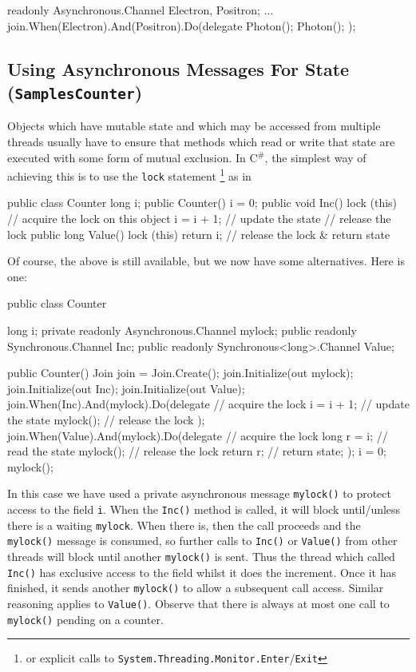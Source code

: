 \documentclass{article}
\newcommand{\csharp}{\texorpdfstring{\mbox{C$^\#$}}{C\#}}
\newcommand{\sample}[1]{\texorpdfstring{{(\texttt{Samples{\symbol{92}}#1})}}{}}
\begin{document}
\begin{lstcsharp}
  readonly Asynchronous.Channel Electron, Positron;
  ...
  join.When(Electron).And(Positron).Do(delegate { 
    Photon(); Photon();
  });
\end{lstcsharp}

\subsection{Using Asynchronous Messages For State \sample{Counter}}
Objects which have mutable state and which may be accessed from
multiple threads usually have to ensure that methods which read or
write that state are executed with some form of mutual exclusion. In \csharp, the simplest way of achieving this is to use the \verb|lock| statement
\footnote{or explicit calls to \texttt{System.Threading.Monitor.Enter}/\texttt{Exit}} as in
\begin{lstcsharp}
  public class Counter {
    long i;
    public Counter() {
      i = 0;
    }
    public void Inc() {
      lock (this) {        // acquire the lock on this object
        i = i + 1;         // update the state
      }                    // release the lock
    }
    public long Value() {
      lock (this) {
        return i;          // release the lock & return state
      }
    }
  }
\end{lstcsharp}

Of course, the above is still available, but we  now have some  alternatives. Here is one:

\begin{lstcsharp}
public class Counter {
  long i;
  private readonly Asynchronous.Channel mylock;
  public readonly Synchronous.Channel Inc;
  public readonly Synchronous<long>.Channel Value;

  public Counter() {
    Join join = Join.Create();
    join.Initialize(out mylock);
    join.Initialize(out Inc);
    join.Initialize(out Value);
    join.When(Inc).And(mylock).Do(delegate 
    { // acquire the lock
        i = i + 1;  // update the state
        mylock();  // release the lock
    });
    join.When(Value).And(mylock).Do(delegate
    { // acquire the lock
        long r = i;  // read the state
        mylock();    // release the lock
        return r;    // return state;
    });
    i = 0;
    mylock();
  }
}
\end{lstcsharp}


In this case we have used a private asynchronous message
\verb|mylock()| to protect access to the field \verb|i|. When the
\verb|Inc()| method is called, it will block until/unless there is a
waiting \verb|mylock|. When there is, then the call proceeds and the
\verb|mylock()| message is consumed, so further calls to \verb|Inc()|
or \verb|Value()| from other threads will block until another
\verb|mylock()| is sent. Thus the thread which called \verb|Inc()| has
exclusive access to the field whilst it does the increment. Once it
has finished, it sends another \verb|mylock()| to allow a subsequent
call access. Similar reasoning applies to \verb|Value()|. Observe that
there is always at most one call to \verb|mylock()| pending on a
counter.
\end{document}
